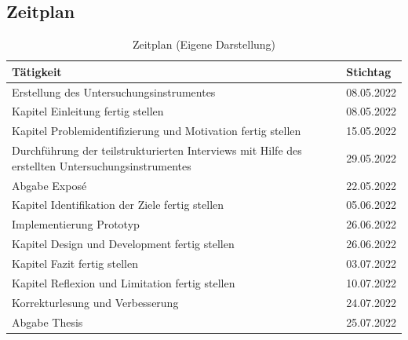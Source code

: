 \documentclass[12pt, oneside]{article}
\begin{document}
\subsection*{Zeitplan}

\begin{table}[ht]
	\begin{tabular}{@{}p{13cm}p{2cm}@{}}
		\toprule
		\textbf{Tätigkeit}                                                                                & \textbf{Stichtag} \\ \midrule
		Erstellung des Untersuchungsinstrumentes                                                          & 08.05.2022        \\ \midrule
		Kapitel Einleitung fertig stellen                                                                 & 08.05.2022        \\ \midrule
		Kapitel Problemidentifizierung und Motivation fertig stellen                                      & 15.05.2022        \\ \midrule
		Durchführung der teilstrukturierten Interviews mit Hilfe des erstellten Untersuchungsinstrumentes & 29.05.2022        \\ \midrule
		Abgabe Exposé                                                                                     & 22.05.2022        \\ \midrule
		Kapitel Identifikation der Ziele fertig stellen                                                   & 05.06.2022        \\ \midrule
		Implementierung Prototyp                                                                          & 26.06.2022        \\ \midrule
		Kapitel Design und Development fertig stellen                                                     & 26.06.2022        \\ \midrule
		Kapitel Fazit fertig stellen                                                                      & 03.07.2022        \\ \midrule
		Kapitel Reflexion und Limitation fertig stellen                                                   & 10.07.2022        \\ \midrule
		Korrekturlesung und Verbesserung                                                                  & 24.07.2022        \\ \midrule
		Abgabe Thesis                                                                                     & 25.07.2022        \\ \bottomrule
	\end{tabular}
	\caption{\label{tab:time-table}Zeitplan (Eigene Darstellung)}
\end{table}
\end{document}
